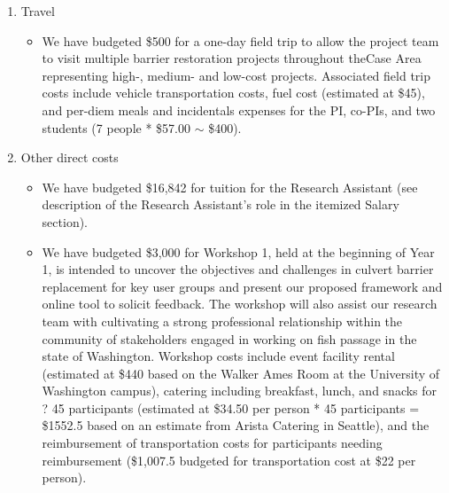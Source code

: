 \begin{enumerate}
\item Travel
\begin{itemize}
\item We have budgeted \$500 for a one-day field trip to allow the project team to visit multiple barrier restoration projects throughout theCase Area representing high-, medium- and low-cost projects. Associated field trip costs include vehicle transportation costs, fuel cost (estimated at \$45), and per-diem meals and incidentals expenses for the PI, co-PIs, and two students (7 people * \$57.00 $\sim$ \$400).
\end{itemize}
\item Other direct costs
\begin{itemize}
\item We have budgeted \$16,842 for tuition for the Research Assistant (see description of the Research Assistant's role in the itemized Salary section).
\item We have budgeted \$3,000 for Workshop 1, held at the beginning of Year 1, is intended to uncover the objectives and challenges in culvert barrier replacement for key user groups and present our proposed framework and online tool to solicit feedback. The workshop will also assist our research team with cultivating a strong professional relationship within the community of stakeholders engaged in working on fish passage in the state of Washington. Workshop costs include event facility rental (estimated at \$440 based on the Walker Ames Room at the University of Washington campus), catering including breakfast, lunch, and snacks for ? 45 participants (estimated at \$34.50 per person * 45 participants = \$1552.5 based on an estimate from Arista Catering in Seattle), and the reimbursement of transportation costs for participants needing reimbursement (\$1,007.5 budgeted for transportation cost at \$22 per person).
\end{itemize}
\end{enumerate}


